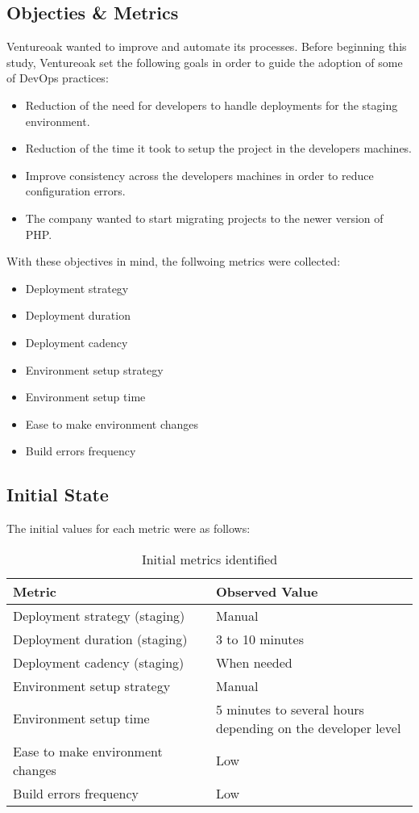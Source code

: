         \subsection{Objecties \& Metrics}
        Ventureoak wanted to improve and automate its processes. Before beginning this study, Ventureoak set the following goals in order to guide the adoption of some of DevOps practices:
        \begin{itemize}
            \item Reduction of the need for developers to handle deployments for the staging environment.
            \item Reduction of the time it took to setup the project in the developers machines.
            \item Improve consistency across the developers machines in order to reduce configuration errors.
            \item The company wanted to start migrating projects to the newer version of PHP.
        \end{itemize}
        With these objectives in mind, the follwoing metrics were collected:
        \begin{itemize}
  			\item Deployment strategy
				\item Deployment duration
				\item Deployment cadency
				\item Environment setup strategy
				\item Environment setup time
				\item Ease to make environment changes
				\item Build errors frequency
			\end{itemize}
			\subsection{Initial State}
			The initial values for each metric were as follows:
			\begin{table}[h!]
				\begin{center}
					\begin{tabular}{| p{0.5\linewidth} | p{0.5\linewidth} |}
						\hline
	 					\textbf{Metric} & \textbf{Observed Value} \\ \hline
	 					Deployment strategy (staging) 		& Manual  \\ \hline
						Deployment duration (staging) 		& 3 to 10 minutes \\ \hline
						Deployment cadency (staging)  		& When needed \\ \hline
						Environment setup strategy			& Manual \\ \hline
						Environment setup time 				& 5 minutes to several hours depending on the developer level \\ \hline
						Ease to make environment changes 	& Low \\ \hline
						Build errors frequency				& Low \\ \hline
					\end{tabular}
				\end{center}
				\caption{Initial metrics identified}
			\end{table}
